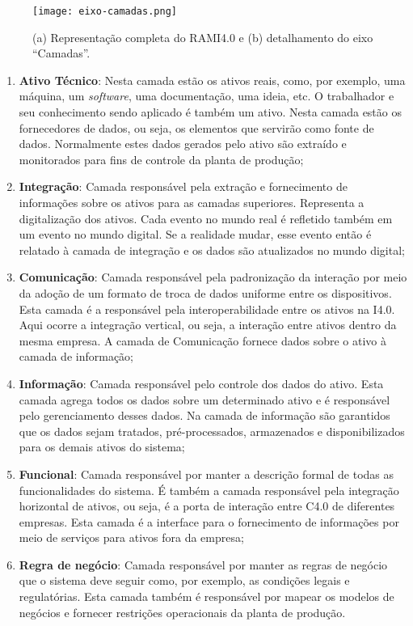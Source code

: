 \begin{figure}[htb]
	\centering
	\texttt{[image: eixo-camadas.png]}
	\caption{(a) Representação completa do RAMI4.0 e (b) detalhamento do eixo ``Camadas''.}
	\label{fig:eixo-camadas}
\end{figure}

\begin{enumerate}
	\item \textbf{Ativo Técnico}: Nesta camada estão os ativos reais, como, por exemplo, uma máquina, um \textit{software}, uma documentação, uma ideia, etc. O trabalhador e seu conhecimento sendo aplicado é também um ativo. Nesta camada estão os fornecedores de dados, ou seja, os elementos que servirão como fonte de dados. Normalmente estes dados gerados pelo ativo são extraído e monitorados para fins de controle da planta de produção;

	\item \textbf{Integração}: Camada responsável pela extração e fornecimento de informações sobre os ativos para as camadas superiores. Representa a digitalização dos ativos. Cada evento no mundo real é refletido também em um evento no mundo digital. Se a realidade mudar, esse evento então é relatado à camada de integração e os dados são atualizados no mundo digital;

	\item \textbf{Comunicação}: Camada responsável pela padronização da interação por meio da adoção de um formato de troca de dados uniforme entre os dispositivos. Esta camada é a responsável pela interoperabilidade entre os ativos na I4.0. Aqui ocorre a integração vertical, ou seja, a interação entre ativos dentro da mesma empresa. A camada de Comunicação fornece dados sobre o ativo à camada de informação;

	\item \textbf{Informação}: Camada responsável pelo controle dos dados do ativo. Esta camada agrega todos os dados sobre um determinado ativo e é responsável pelo gerenciamento desses dados. Na camada de informação são garantidos que os dados sejam tratados, pré-processados, armazenados e disponibilizados para os demais ativos do sistema;

	\item \textbf{Funcional}: Camada responsável por manter a descrição formal de todas as funcionalidades do sistema. É também a camada responsável pela integração horizontal de ativos, ou seja, é a porta de interação entre C4.0 de diferentes empresas. Esta camada é a interface para o fornecimento de informações por meio de serviços para ativos fora da empresa;

	\item \textbf{Regra de negócio}: Camada responsável por manter as regras de negócio que o sistema deve seguir como, por exemplo, as condições legais e regulatórias. Esta camada também é responsável por mapear os modelos de negócios e fornecer restrições operacionais da planta de produção.
\end{enumerate}

